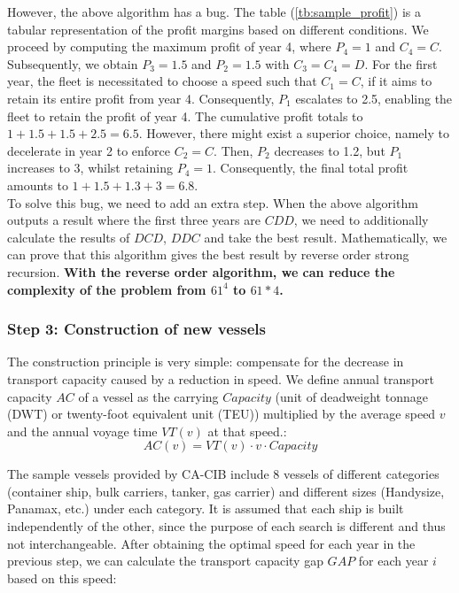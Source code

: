 \documentclass[a4paper,12pt]{article}
\begin{document}
However, the above algorithm has a bug.
The table (\ref{tb:sample_profit}) is a tabular representation of the profit margins based on different conditions.
We proceed by computing the maximum profit of year 4, where $P_4 = 1$ and $C_4 = C$. Subsequently, we obtain $P_3 = 1.5$ and $P_2 = 1.5$ with $C_3 = C_4 = D$. 
For the first year, the fleet is necessitated to choose a speed such that $C_1 = C$, if it aims to retain its entire profit from year 4. 
Consequently, $P_1$ escalates to 2.5, enabling the fleet to retain the profit of year 4. 
The cumulative profit totals to $1+1.5+1.5+2.5 = 6.5$. 
However, there might exist a superior choice, namely to decelerate in year 2 to enforce $C_2 = C$. 
Then, $P_2$ decreases to 1.2, but $P_1$ increases to 3, whilst retaining $P_4 = 1$. 
Consequently, the final total profit amounts to $1 + 1.5 + 1.3 + 3 = 6.8$. \\ 

To solve this bug, we need to add an extra step. 
When the above algorithm outputs a result where the first three years are $CDD$, we need to additionally calculate the results of $DCD$, $DDC$ and take the best result. Mathematically, we can prove that this algorithm gives the best result by reverse order strong recursion.
\textbf{With the reverse order algorithm, we can reduce the complexity of the problem from $61^4$ to $61*4$.}





\subsubsection{Step 3: Construction of new vessels}
The construction principle is very simple: compensate for the decrease in transport capacity caused by a reduction in speed.
We define annual transport capacity $AC$ of a vessel as the carrying $Capacity$ (unit of deadweight tonnage (DWT) or twenty-foot equivalent unit (TEU)) multiplied by the average speed $v$ and the annual voyage time $VT(v)$ at that speed.:
\begin{equation}
	\label{eq:AC}
	AC(v) = VT(v)  \cdot v \cdot Capacity
\end{equation}

The sample vessels provided by CA-CIB include 8 vessels of different categories (container ship, bulk carriers, tanker, gas carrier) and different sizes (Handysize, Panamax, etc.) under each category.
It is assumed that each ship is built independently of the other, since the purpose of each search is different and thus not interchangeable.
After obtaining the optimal speed for each year in the previous step, we can calculate the transport capacity gap $GAP$ for each year $i$ based on this speed:
\end{document}
